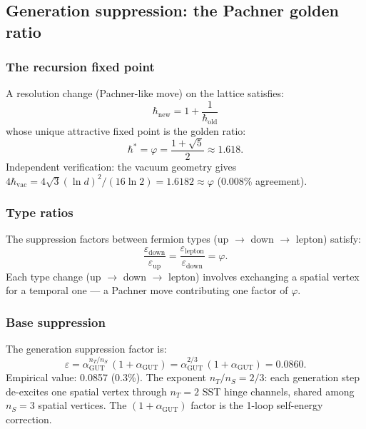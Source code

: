\subsection{Generation suppression: the Pachner golden ratio}

\subsubsection{The recursion fixed point}

A resolution change (Pachner-like move) on the lattice satisfies:
\begin{equation}
\hbar_\text{new} = 1 + \frac{1}{\hbar_\text{old}}
\end{equation}
whose unique attractive fixed point is the golden ratio:
\begin{equation}
\hbar^* = \varphi = \frac{1 + \sqrt{5}}{2} \approx 1.618.
\end{equation}
Independent verification: the vacuum geometry gives $4\hbar_\text{vac} = 4\sqrt{3}(\ln d)^2/(16\ln 2) = 1.6182 \approx \varphi$ (0.008\% agreement).

\subsubsection{Type ratios}

The suppression factors between fermion types (up $\to$ down $\to$ lepton) satisfy:
\begin{equation}
\frac{\varepsilon_\text{down}}{\varepsilon_\text{up}} = \frac{\varepsilon_\text{lepton}}{\varepsilon_\text{down}} = \varphi.
\end{equation}
Each type change (up $\to$ down $\to$ lepton) involves exchanging a spatial vertex for a temporal one --- a Pachner move contributing one factor of $\varphi$.

\subsubsection{Base suppression}

The generation suppression factor is:
\begin{equation}
\varepsilon = \alpha_\text{GUT}^{n_T/n_S}\,(1 + \alpha_\text{GUT}) = \alpha_\text{GUT}^{2/3}\,(1 + \alpha_\text{GUT}) = 0.0860.
\end{equation}
Empirical value: 0.0857 (0.3\%). The exponent $n_T/n_S = 2/3$: each generation step de-excites one spatial vertex through $n_T = 2$ SST hinge channels, shared among $n_S = 3$ spatial vertices. The $(1 + \alpha_\text{GUT})$ factor is the 1-loop self-energy correction.


